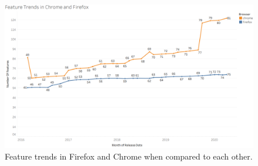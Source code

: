 \begin{figure}[ht]
    \centering
    \includegraphics[width=\columnwidth]{figures/Feature-Trends.PNG}
    \caption{Feature trends in Firefox and Chrome when compared to
      each other.}
    \label{fig:featuretrends}
\end{figure}
